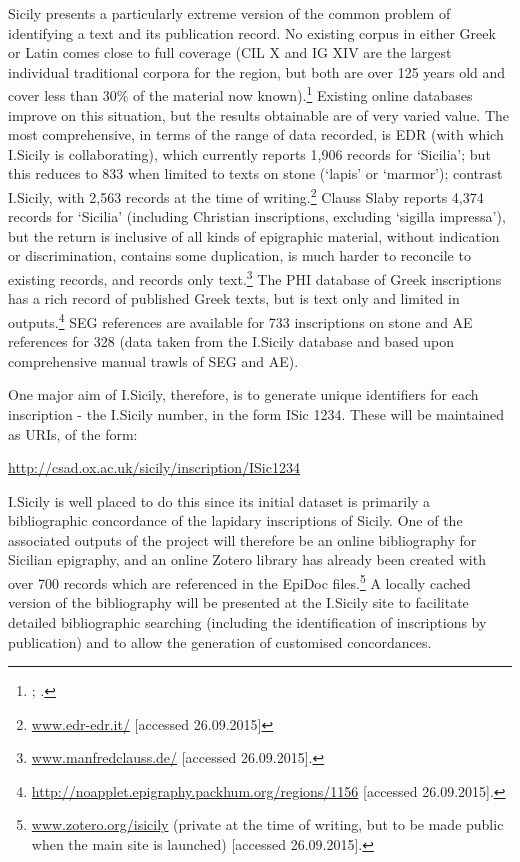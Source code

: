 \documentclass[amsthm,ebook]{saparticle}
\begin{document}
\noindent Sicily presents a particularly extreme version of the common problem of identifying a text and its publication record.
No existing corpus in either Greek or Latin comes close to full coverage (CIL X and IG XIV are the largest individual
traditional corpora for the region, but both are over 125 years old and cover less than 30\% of the material now
known).\footnote{\citet{_inscriptiones_1883}; \citet{kaibel_inscriptiones_1890}.} Existing online databases improve on this situation, but the results
obtainable are of very varied value. The most comprehensive, in terms of the range of data recorded, is EDR (with which
I.Sicily is collaborating), which currently reports 1,906 records for `Sicilia'; but this reduces to 833 when limited
to texts on stone (`lapis' or `marmor'); contrast I.Sicily, with 2,563 records at the time of writing.\footnote{
\url{www.edr-edr.it/} [accessed 26.09.2015]} Clauss Slaby reports 4,374 records for `Sicilia' (including Christian
inscriptions, excluding `sigilla impressa'), but the return is inclusive of all kinds of epigraphic material, without
indication or discrimination, contains some duplication, is much harder to reconcile to existing records, and records
only text.\footnote{ \url{www.manfredclauss.de/} [accessed 26.09.2015].} The PHI database of Greek inscriptions has a rich
record of published Greek texts, but is text only and limited in outputs.\footnote{
\url{http://noapplet.epigraphy.packhum.org/regions/1156} [accessed 26.09.2015].} SEG references are available for 733
inscriptions on stone and AE references for 328 (data taken from the I.Sicily database and based upon comprehensive
manual trawls of SEG and AE).

One major aim of I.Sicily, therefore, is to generate unique identifiers for each inscription - the I.Sicily number, in
the form ISic 1234. These will be maintained as URIs, of the form:

\url{http://csad.ox.ac.uk/sicily/inscription/ISic1234}

I.Sicily is well placed to do this since its initial dataset is primarily a bibliographic concordance of the lapidary
inscriptions of Sicily. One of the associated outputs of the project will therefore be an online bibliography for
Sicilian epigraphy, and an online Zotero library has already been created with over 700 records which are referenced in
the EpiDoc files.\footnote{\url{www.zotero.org/isicily} (private at the time of writing, but to be made public when the main
site is launched) [accessed 26.09.2015].} A locally cached version of the bibliography will be presented at the
I.Sicily site to facilitate detailed bibliographic searching (including the identification of inscriptions by
publication) and to allow the generation of customised concordances.
\end{document}
